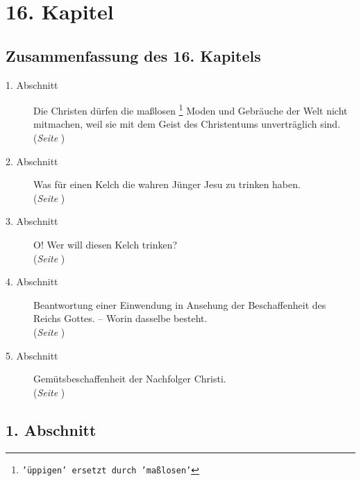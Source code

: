 


\chapter{16. Kapitel} \label{kap16}
\section{Zusammenfassung des 16. Kapitels}

\begin{description}
\item[1. Abschnitt] Die Christen dürfen die maßlosen
\footnote{\texttt{'üppigen' ersetzt durch 'maßlosen'}}
Moden und Gebräuche der Welt
nicht mitmachen, weil sie mit dem Geist des Christentums unverträglich sind.
\\(\textit{Seite \pageref{kap16_ab1}})
\item[2. Abschnitt] Was für einen Kelch die wahren Jünger Jesu zu trinken haben.
\\(\textit{Seite \pageref{kap16_ab2}})
\item[3. Abschnitt] O! Wer will diesen Kelch trinken?
\\(\textit{Seite \pageref{kap16_ab3}})
\item[4. Abschnitt] Beantwortung einer Einwendung in Ansehung der Beschaffenheit
des Reichs Gottes. -- Worin dasselbe besteht.
\\(\textit{Seite \pageref{kap16_ab4}})
\item[5. Abschnitt] Gemütsbeschaffenheit der Nachfolger Christi.
\\(\textit{Seite \pageref{kap16_ab5}})

\end{description}

\newpage 

\section{1. Abschnitt} \label{kap16_ab1}

